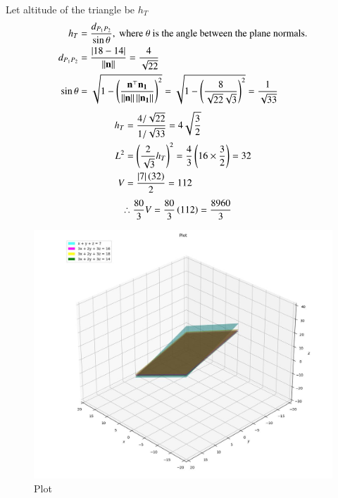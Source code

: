 \documentclass[journal]{IEEEtran}
\begin{document}
Let altitude of the triangle be $h_T$
\begin{align}
    h_T &= \frac{d_{P_1P_2}}{\sin\theta},\text{ where }\theta\text{ is the angle between the plane normals.} \\
    d_{P_1P_2} &= \frac{\left\vert18-14\right\vert}{\left\lVert\mathbf{n}\right\rVert} = \frac{4}{\sqrt{22}} \\
    \sin\theta &= \sqrt{1 - \left(\frac{\mathbf{n}^\top\mathbf{n_1}}{\left\lVert\mathbf{n}\right\rVert\left\lVert\mathbf{n_1}\right\rVert}\right)^2} = \sqrt{1 - \left(\frac{8}{\sqrt{22}\sqrt{3}}\right)^2} = \frac{1}{\sqrt{33}}
\end{align}
\begin{align}
    h_T &= \frac{4/\sqrt{22}}{1/\sqrt{33}} = 4\sqrt{\frac{3}{2}} \\
    L^2 &= \left(\frac{2}{\sqrt{3}}h_T\right)^2 = \frac{4}{3}\left(16 \times \frac{3}{2}\right) = 32 \\
    V &= \frac{\left\vert7\right\vert\left(32\right)}{2} = 112
\end{align}
\begin{align}
    \therefore \frac{80}{3}V &= \frac{80}{3}\left(112\right) = \frac{8960}{3}
\end{align}

\begin{figure}[h!]
	\centering
	\includegraphics[width=\columnwidth]{figs/plot_p.jpg}
	\caption*{Plot}
	\label{fig:fig}
\end{figure}
\end{document}
